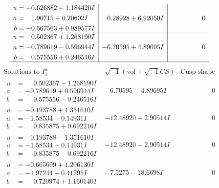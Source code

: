 \documentclass[1p]{elsarticle_modified}
\theoremstyle{definition}
\newcommand{\I}{\sqrt{-1}}
\begin{document}
$$\begin{array}{c|c|c}
\begin{aligned}
u &= -0.626882 - 1.184420 I \\
a &= \phantom{-}1.90715 + 0.20602 I \\
b &= -0.567563 + 0.989577 I\end{aligned}
 & \phantom{-}0.28928 + 6.92050 I & \phantom{-0.000000 } 0 \\ \hline\begin{aligned}
u &= \phantom{-}0.502367 + 1.268190 I \\
a &= -0.789619 - 0.596944 I \\
b &= \phantom{-}0.575556 + 0.246516 I\end{aligned}
 & -6.70595 + 4.89695 I & \phantom{-0.000000 } 0\\
 \hline 
 \end{array}$$\newpage$$\begin{array}{c|c|c}  
\text{Solutions to }I^u_{1}& \I (\text{vol} + \sqrt{-1}CS) & \text{Cusp shape}\\
 \hline 
\begin{aligned}
u &= \phantom{-}0.502367 - 1.268190 I \\
a &= -0.789619 + 0.596944 I \\
b &= \phantom{-}0.575556 - 0.246516 I\end{aligned}
 & -6.70595 - 4.89695 I & \phantom{-0.000000 } 0 \\ \hline\begin{aligned}
u &= -0.193788 + 1.351610 I \\
a &= -1.58534 - 0.14931 I \\
b &= \phantom{-}0.835875 + 0.692216 I\end{aligned}
 & -12.48920 + 2.90514 I & \phantom{-0.000000 } 0 \\ \hline\begin{aligned}
u &= -0.193788 - 1.351610 I \\
a &= -1.58534 + 0.14931 I \\
b &= \phantom{-}0.835875 - 0.692216 I\end{aligned}
 & -12.48920 - 2.90514 I & \phantom{-0.000000 } 0 \\ \hline\begin{aligned}
u &= -0.665699 + 1.206130 I \\
a &= -1.97244 + 0.41295 I \\
b &= \phantom{-}0.720974 + 1.160140 I\end{aligned}
 & -7.5275 - 18.6698 I & \phantom{-0.000000 } 0 \\ \hline\begin{aligned}

\end{aligned}
\end{array}$$
\end{document}
